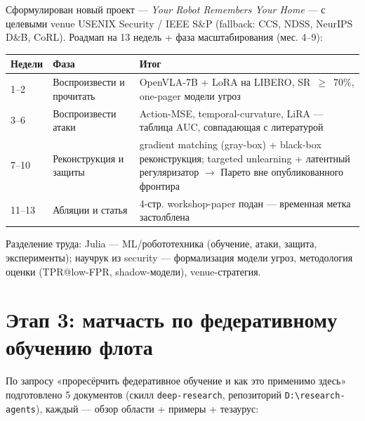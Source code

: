 \documentclass[11pt]{article}
\begin{document}
Сформулирован новый проект — \emph{Your Robot Remembers Your Home} — с целевыми
venue USENIX Security / IEEE S\&P (fallback: CCS, NDSS, NeurIPS D\&B, CoRL).
Роадмап на 13 недель + фаза масштабирования (мес. 4--9):

\begin{center}
\begin{tabular}{@{}p{2.1cm}p{3.3cm}p{8.5cm}@{}}
\toprule
Недели & Фаза & Итог \\
\midrule
1--2 & Воспроизвести и прочитать & OpenVLA-7B + LoRA на LIBERO, SR~$\ge$~70\%, one-pager
  модели угроз \\
3--6 & Воспроизвести атаки & Action-MSE, temporal-curvature, LiRA — таблица AUC,
  совпадающая с литературой \\
7--10 & Реконструкция и защиты & gradient matching (gray-box) + black-box
  реконструкция; targeted unlearning + латентный регуляризатор $\to$ Парето вне
  опубликованного фронтира \\
11--13 & Абляции и статья & 4-стр. workshop-paper подан — временная метка
  застолблена \\
\bottomrule
\end{tabular}
\end{center}

Разделение труда: Julia — ML/робототехника (обучение, атаки, защита, эксперименты);
научрук из security — формализация модели угроз, методология оценки
(TPR@low-FPR, shadow-модели), venue-стратегия.

\section{Этап 3: матчасть по федеративному обучению флота}

По запросу «проресёрчить федеративное обучение и как это применимо здесь»
подготовлено 5 документов (скилл \texttt{deep-research}, репозиторий
\texttt{D:\textbackslash research-agents}), каждый — обзор области + примеры +
тезаурус:
\end{document}
